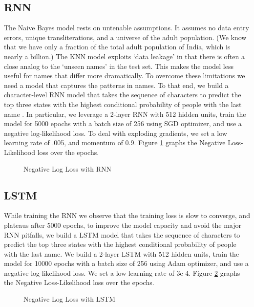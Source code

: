 \documentclass[11pt,  letterpaper]{article}
\begin{document}
\subsection{RNN}

The Naive Bayes model rests on untenable assumptions. It assumes no data entry errors, unique transliterations, and a universe of the adult population. (We know that we have only a fraction of the total adult population of India, which is nearly a billion.) The KNN model exploits `data leakage' in that there is often a close analog to the `unseen names' in the test set. This makes the model less useful for names that differ more dramatically. To overcome these limitations we need a model that captures the patterns in names. To that end, we build a character-level RNN model that takes the sequence of characters to predict the top three states with the highest conditional probability of people with the last name \citep{10.1145/3426826.3426842, 8469258}. In particular, we leverage a 2-layer RNN with 512 hidden units, train the model for 5000 epochs with a batch size of 256 using SGD optimizer, and use a negative log-likelihood loss. To deal with exploding gradients, we set a low learning rate of .005, and momentum of 0.9. Figure \ref{fig1:rnn_loss} graphs the Negative Loss-Likelihood loss over the epochs.

\begin{figure}[ht]
  \centering
  \caption{Negative Log Loss with RNN}
  \label{fig1:rnn_loss}
\end{figure}

\subsection{LSTM}

While training the RNN we observe that the training loss is slow to converge, and plateaus after 5000 epochs, to improve the model capacity and avoid the major RNN pitfalls, we build a LSTM model that takes the sequence of characters to predict the top three states with the highest conditional probability of people with the last name. We build a 2-layer LSTM with 512 hidden units, train the model for 10000 epochs with a batch size of 256 using Adam optimizer, and use a negative log-likelihood loss. We set a low learning rate of 3e-4. Figure \ref{fig2:lstm_loss} graphs the Negative Loss-Likelihood loss over the epochs.

\begin{figure}[ht]
  \centering
  \caption{Negative Log Loss with LSTM}
  \label{fig2:lstm_loss}
\end{figure}
\end{document}
